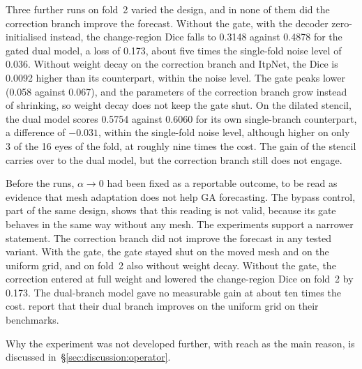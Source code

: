 Three further runs on fold~2 varied the design, and in none of them did
the correction branch improve the forecast. Without the gate, with the
decoder zero-initialised instead, the change-region Dice falls to 0.3148
against 0.4878 for the gated dual model, a loss of 0.173, about five times
the single-fold noise level of 0.036. Without weight decay on the
correction branch and ItpNet, the Dice is 0.0092 higher than its
counterpart, within the noise level. The gate peaks lower (0.058
against 0.067), and the parameters of the correction branch grow instead
of shrinking, so weight decay does not keep the gate shut. On the dilated
stencil, the dual model scores 0.5754 against 0.6060 for its own
single-branch counterpart, a difference of $-0.031$, within the
single-fold noise level, although higher on only 3 of the 16 eyes of the
fold, at roughly nine times the cost. The
gain of the stencil carries over to the dual model, but the correction
branch still does not engage.

Before the runs, $\alpha \to 0$ had been fixed as a reportable outcome, to
be read as evidence that mesh adaptation does not help GA forecasting. The
bypass control, part of the same design, shows that this reading is not
valid, because its gate behaves in the same way without any mesh. The
experiments support a narrower statement. The correction branch did not
improve the forecast in any tested variant. With the gate, the gate stayed
shut on the moved mesh and on the uniform grid, and on fold~2 also without
weight decay. Without the gate, the correction entered at full weight and
lowered the change-region Dice on fold~2 by 0.173. The dual-branch model
gave no measurable gain at about ten times the cost. \citet{Hu2024}
report that their dual branch improves on the uniform grid on their
benchmarks.

Why the experiment was not developed further, with reach as the main
reason, is discussed in~\S\ref{sec:discussion:operator}.

